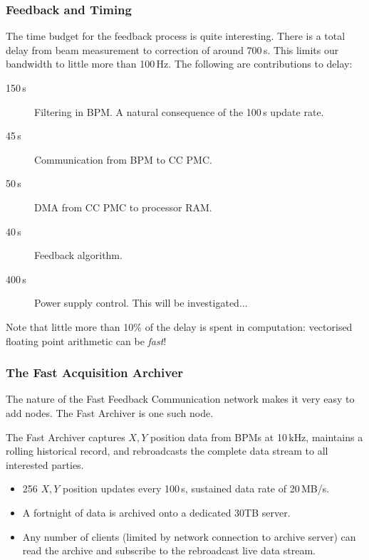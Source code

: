 \documentclass{beamer}
\begin{document}
%
\begin{frame}\frametitle{Feedback and Timing}

The time budget for the feedback process is quite interesting.  There is a
total delay from beam measurement to correction of around 700\,\textmu s.  This
limits our bandwidth to little more than 100\,Hz.  The following are
contributions to delay:

\begin{description}
\item[150\,\textmu s] Filtering in BPM.  A natural consequence of the
100\,\textmu s update rate.
\item[45\,\textmu s] Communication from BPM to CC PMC.
\item[50\,\textmu s] DMA from CC PMC to processor RAM.
\item[40\,\textmu s] Feedback algorithm.
\item[400\,\textmu s] Power supply control.  This will be investigated...
\end{description}

\medskip

Note that little more than 10\% of the delay is spent in computation: vectorised
floating point arithmetic can be \emph{fast}!

\end{frame}


%
\begin{frame}\frametitle{The Fast Acquisition Archiver}

The nature of the Fast Feedback Communication network makes it very easy to add
nodes.  The Fast Archiver is one such node.

\medskip

The Fast Archiver captures $X,Y$ position data from BPMs at 10\,kHz, maintains a
rolling historical record, and rebroadcasts the complete data stream to all
interested parties.

\begin{itemize}

\item 256 $X,Y$ position updates every 100\,\textmu s, sustained data
rate of 20\,MB/s.

\item A fortnight of data is archived onto a dedicated 30TB server.

\item Any number of clients (limited by network connection to archive server)
can read the archive and subscribe to the rebroadcast live data stream.

\end{itemize}
\end{frame}
\end{document}
